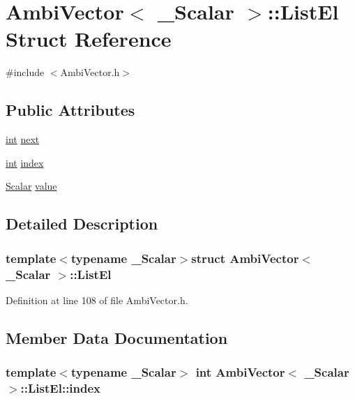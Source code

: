 \hypertarget{struct_ambi_vector_1_1_list_el}{\section{Ambi\-Vector$<$ \-\_\-\-Scalar $>$\-:\-:List\-El Struct Reference}
\label{struct_ambi_vector_1_1_list_el}
}


{\ttfamily \#include $<$Ambi\-Vector.\-h$>$}

\subsection*{Public Attributes}
\begin{DoxyCompactItemize}
\item 
\hyperlink{ioapi_8h_a787fa3cf048117ba7123753c1e74fcd6}{int} \hyperlink{struct_ambi_vector_1_1_list_el_ad3f6f5a564dcfef92737262ba9076fc1}{next}
\item 
\hyperlink{ioapi_8h_a787fa3cf048117ba7123753c1e74fcd6}{int} \hyperlink{struct_ambi_vector_1_1_list_el_afc8ff1487efca598e3afd5a796902e06}{index}
\item 
\hyperlink{class_ambi_vector_a08d3ee74ff00bc66d19750bf79989e92}{Scalar} \hyperlink{struct_ambi_vector_1_1_list_el_a17bb0185658f78a923e35c4f5e6a553c}{value}
\end{DoxyCompactItemize}


\subsection{Detailed Description}
\subsubsection*{template$<$typename \-\_\-\-Scalar$>$struct Ambi\-Vector$<$ \-\_\-\-Scalar $>$\-::\-List\-El}



Definition at line 108 of file Ambi\-Vector.\-h.



\subsection{Member Data Documentation}
\hypertarget{struct_ambi_vector_1_1_list_el_afc8ff1487efca598e3afd5a796902e06}{
\subsubsection[{index}]{\setlength{\rightskip}{0pt plus 5cm}template$<$typename \-\_\-\-Scalar$>$ {\bf int} {\bf Ambi\-Vector}$<$ \-\_\-\-Scalar $>$\-::List\-El\-::index}}\label{struct_ambi_vector_1_1_list_el_afc8ff1487efca598e3afd5a796902e06}


